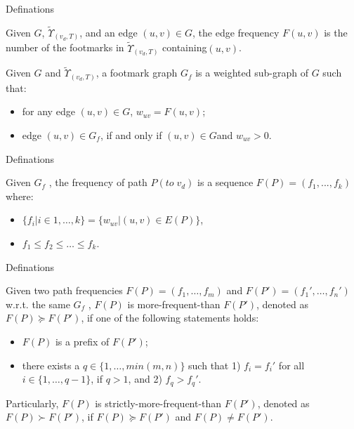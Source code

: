 \documentclass[mathserif]{beamer}
\begin{document}
\begin{frame}{Definations}

\begin{defination}
Given $G$, $\widetilde{\Upsilon}_{(v_d,T )}$, and an edge $(u, v) \in{} G$, the edge frequency $F (u, v)$ is the number of the footmarks in $\widetilde{\Upsilon}_{(v_d,T )}$ containing$(u,v)$.
\end{defination}
\begin{defination}
Given $G$ and $\widetilde{\Upsilon}_{(v_d,T )}$, a footmark graph $G_f$ is a weighted sub-graph of $G$ such that:
	\begin{itemize}
	\item for any edge $(u,v) \in G$, $w_{uv} = F(u,v)$;
	\item edge $(u,v)\in{}G_f$, if and only if $(u,v)\in{} G $and $w_{uv}>0 $.
	\end{itemize}
\end{defination}
\end{frame}

\begin{frame}{Definations}
\begin{defination}
Given $G_f$ , the frequency of path $P (to \; v_d)$ is a sequence $F(P) = (f_1,...,f_k)$ where:
	\begin{itemize}
	\item $\{f_i|i \in{} {1,\ldots{},k}\} = \{w_{uv}|(u,v) \in{} E(P)\}$,
	\item $f_1 \leq{} f_2 \leq{} \ldots{} \leq{} f_k$.
	\end{itemize}
\end{defination}
\end{frame}

\begin{frame}{Definations}
\begin{defination}
Given two path frequencies $F(P) = (f_1,\dots{},f_m)$ and $F(P') = (f_1',\ldots{},f_n' )$ w.r.t. the same $G_f$ , $F (P )$ is more-frequent-than $F (P')$, denoted as
$F (P ) \succeq{} F (P' )$, if one of the following statements holds:
	\begin{itemize}
	\item $F(P)$ is a prefix of $F(P')$;
	\item there exists a $q \in{} \{1,\ldots{},min(m,n)\}$ such that 1) $f_i = f_i'$
for all $i \in{}\{1,\ldots{},q−1\}$, if $q>1$, and 2) $f_q >f_q'$.
	\end{itemize}
Particularly, $F(P)$ is strictly-more-frequent-than $F(P')$, denoted
as $F(P) \succ{} F(P')$, if $F(P) \succeq{} F(P')$ and $F(P) \neq{} F(P')$.
\end{defination}

\end{frame}
\end{document}
